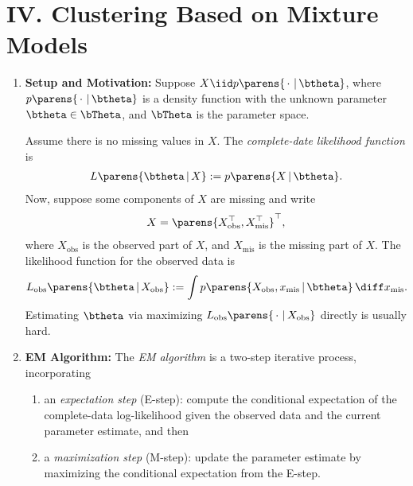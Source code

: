 \documentclass[12pt]{article}
\begin{document}
\section*{IV. Clustering Based on Mixture Models}

\begin{enumerate}[label=\textbf{\arabic*.}]

	\item \textbf{Setup and Motivation:} Suppose $X \iid p \parens{\,\cdot\, \,\vert\, \btheta}$, where $p \parens{\,\cdot\, \,\vert\, \btheta}$ is a density function with the unknown parameter $\btheta \in \bTheta$, and $\bTheta$ is the parameter space. 
	
	Assume there is no missing values in $X$. The \emph{complete-date likelihood function} is 
	\begin{align*}
		L \parens{\btheta \,\vert\, X} := p \parens{X \,\vert\, \btheta}. 
	\end{align*}
	Now, suppose some components of $X$ are missing and write 
	\begin{align*}
		X = \parens{X_{\mathrm{obs}}^\top, X_{\mathrm{mis}}^\top}^\top, 
	\end{align*}
	where $X_{\mathrm{obs}}$ is the observed part of $X$, and $X_{\mathrm{mis}}$ is the missing part of $X$. The likelihood function for the observed data is 
	\begin{align*}
		L_{\mathrm{obs}} \parens{\btheta \,\vert\, X_{\mathrm{obs}}} := \int p \parens{X_{\mathrm{obs}}, x_{\mathrm{mis}} \,\vert\, \btheta} \, \diff x_{\mathrm{mis}}. 
	\end{align*}
	Estimating $\btheta$ via maximizing $L_{\mathrm{obs}} \parens{\,\cdot\,\,\vert\, X_{\mathrm{obs}}}$ directly is usually hard. 
	
	\item \textbf{EM Algorithm:} The \emph{EM algorithm} is a two-step iterative process, incorporating 
	\begin{enumerate}
		\item an \emph{expectation step} (E-step): compute the conditional expectation of the complete-data log-likelihood given the observed data and the current parameter estimate, and then 
		\item a \emph{maximization step} (M-step): update the parameter estimate by maximizing the conditional expectation from the E-step. 
	\end{enumerate}
	

\end{enumerate}
\end{document}
